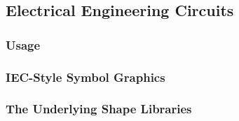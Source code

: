 \subsection{Electrical Engineering Circuits}

\subsubsection{Usage}

\subsubsection{IEC-Style Symbol Graphics}

\subsubsection{The Underlying Shape Libraries}




\endinput



